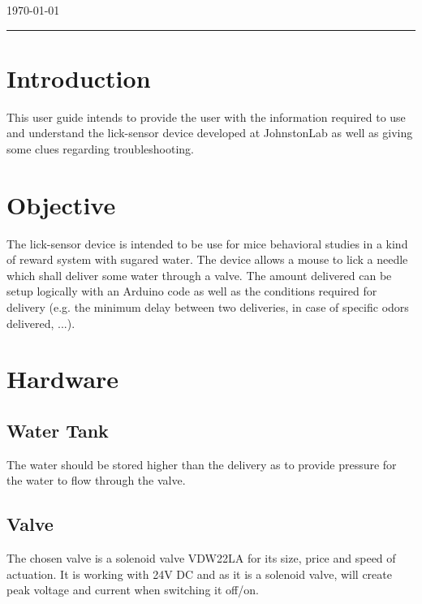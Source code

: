 \documentclass[a4paper]{article}
\begin{document}
\begin{titlepage}

{\large \today}\\[2cm] %


\vfill %

\end{titlepage}


\noindent\rule{\textwidth}{1pt}

\tableofcontents

\newpage

\listoffigures

\newpage



\section{Introduction}
This user guide intends to provide the user with the information required to use and understand the lick-sensor device developed at JohnstonLab as well as giving some clues regarding troubleshooting.


\section{Objective}
The lick-sensor device is intended to be use for mice behavioral studies in a kind of reward system with sugared water. The device allows a mouse to lick a needle which shall deliver some water through a valve. The amount delivered can be setup logically with an Arduino code as well as the conditions required for delivery (e.g. the minimum delay between two deliveries, in case of specific odors delivered, ...). 

\section{Hardware}
\subsection{Water Tank}
The water should be stored higher than the delivery as to provide pressure for the water to flow through the valve.
\subsection{Valve}
The chosen valve is a solenoid valve VDW22LA for its size, price and speed of actuation. It is working with 24V DC and as it is a solenoid valve, will create peak voltage and current when switching it off/on.
\end{document}
